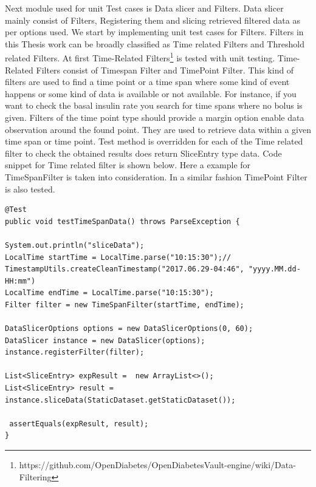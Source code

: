 \documentclass[article,type=msc,colorback,accentcolor=tud9c,twoside,11pt]{tudthesis}
\begin{document}
Next module used for unit Test cases is Data slicer and Filters. Data slicer mainly consist of Filters, Registering them and slicing retrieved filtered data as per options used. We start by implementing unit test cases for Filters. Filters in this Thesis work can be broadly classified as Time related Filters and Threshold related Filters. At first Time-Related Filters\footnote{https://github.com/OpenDiabetes/OpenDiabetesVault-engine/wiki/Data-Filtering} is tested with unit testing. Time-Related Filters consist of Timespan Filter and TimePoint Filter. This kind of filters are used to find a time point or a time span where some kind of event happens or some kind of data is available or not available. For instance, if you want to check the basal insulin rate you search for time spans where no bolus is given. Filters of the time point type should provide a margin option enable data observation around the found point. They are used to retrieve data within a given time span or time point. Test method is overridden for each of the Time related filter to check the obtained results does return SliceEntry type data. Code snippet for Time related filter is shown below. Here a example for TimeSpanFilter is taken into consideration. In a similar fashion TimePoint Filter is also tested.
\begin{lstlisting}
@Test
public void testTimeSpanData() throws ParseException {

System.out.println("sliceData");
LocalTime startTime = LocalTime.parse("10:15:30");//  TimestampUtils.createCleanTimestamp("2017.06.29-04:46", "yyyy.MM.dd-HH:mm")
LocalTime endTime = LocalTime.parse("10:15:30");
Filter filter = new TimeSpanFilter(startTime, endTime);

DataSlicerOptions options = new DataSlicerOptions(0, 60);
DataSlicer instance = new DataSlicer(options);
instance.registerFilter(filter);

List<SliceEntry> expResult =  new ArrayList<>();
List<SliceEntry> result = instance.sliceData(StaticDataset.getStaticDataset());

 assertEquals(expResult, result);
}
\end{lstlisting}
\end{document}
